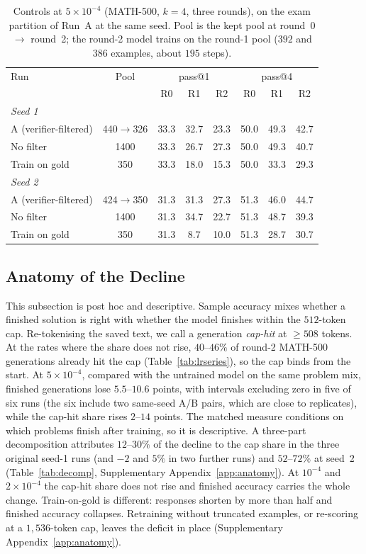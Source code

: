 \documentclass[runningheads]{llncs}
\begin{document}
\begin{table}[!htb]
\caption{Controls at $5\times10^{-4}$ (MATH-500, $k=4$, three rounds), on the
exam partition of Run~A at the same seed. Pool is the kept pool at round~0 $\to$ round~2; the round-2 model trains on the
round-1 pool ($392$ and $386$ examples, about $195$ steps).}
\label{tab:controls}
\centering
\setlength{\tabcolsep}{5pt}
\begin{tabular}{lccccccc}
\toprule
Run & Pool & \multicolumn{3}{c}{pass@1} & \multicolumn{3}{c}{pass@4} \\
 &  & R0 & R1 & R2 & R0 & R1 & R2 \\
\midrule
\multicolumn{8}{l}{\emph{Seed 1}} \\
A (verifier-filtered) & 440$\to$326 & 33.3 & 32.7 & 23.3 & 50.0 & 49.3 & 42.7 \\
No filter             & 1400 & 33.3 & 26.7 & 27.3 & 50.0 & 49.3 & 40.7 \\
Train on gold         & 350  & 33.3 & 18.0 & 15.3 & 50.0 & 33.3 & 29.3 \\
\midrule
\multicolumn{8}{l}{\emph{Seed 2}} \\
A (verifier-filtered) & 424$\to$350 & 31.3 & 31.3 & 27.3 & 51.3 & 46.0 & 44.7 \\
No filter             & 1400 & 31.3 & 34.7 & 22.7 & 51.3 & 48.7 & 39.3 \\
Train on gold         & 350  & 31.3 & 8.7 & 10.0 & 51.3 & 28.7 & 30.7 \\
\bottomrule
\end{tabular}
\end{table}

\subsection{Anatomy of the Decline}
\label{sec:anatomy}

This subsection is post hoc and descriptive. Sample accuracy mixes whether a
finished solution is right with whether the model finishes within the $512$-token cap. Re-tokenising the saved text, we call a generation
\emph{cap-hit} at $\ge508$ tokens. At the rates where the share does not rise, $40$--$46\%$ of round-2 MATH-500 generations
already hit the cap (Table~\ref{tab:lrseries}), so the cap binds from the start. At $5\times10^{-4}$, compared with the untrained model on the same
problem mix, finished generations lose $5.5$--$10.6$ points, with intervals
excluding zero in five of six runs (the six include two same-seed A/B pairs,
which are close to replicates), while the cap-hit share rises $2$--$14$ points.
The matched measure conditions on which problems finish after training, so it is
descriptive. A three-part decomposition attributes $12$--$30\%$ of the decline to the cap share in the
three original seed-1 runs (and $-2$ and $5\%$ in two further runs) and $52$--$72\%$ at seed~2 (Table~\ref{tab:decomp}, Supplementary Appendix~\ref{app:anatomy}). At
$10^{-4}$ and $2\times10^{-4}$ the cap-hit share does not rise and finished
accuracy carries the whole change. Train-on-gold is different: responses
shorten by more than half and finished accuracy collapses. Retraining without truncated examples, or re-scoring at a $1{,}536$-token
cap, leaves the deficit in place (Supplementary Appendix~\ref{app:anatomy}).
\end{document}
